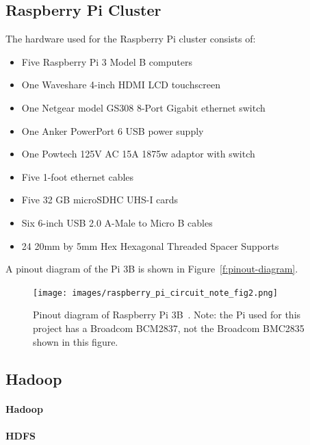 \subsection{Raspberry Pi Cluster}

The hardware used for the Raspberry Pi cluster consists of:

\begin{itemize}
\item Five Raspberry Pi 3 Model B computers 
\item One Waveshare 4-inch HDMI LCD touchscreen
\item One Netgear model GS308 8-Port Gigabit ethernet switch
\item One Anker PowerPort 6 USB power supply
\item One Powtech 125V AC 15A 1875w adaptor with switch
\item Five 1-foot ethernet cables
\item Five 32 GB microSDHC UHS-I cards
\item Six 6-inch USB 2.0 A-Male to Micro B cables
\item 24 20mm by 5mm Hex Hexagonal Threaded Spacer Supports
\end{itemize}

A pinout diagram of the Pi 3B is shown in Figure~\ref{f:pinout-diagram}.

\begin{figure}[!ht]
  \centering\texttt{[image: images/raspberry\_pi\_circuit\_note\_fig2.png]}
  \caption{Pinout diagram of Raspberry Pi 3B~\cite{hid-sp18-419-pi-pinout}. Note: the Pi used for this project has a Broadcom BCM2837, not the Broadcom BMC2835 shown in this figure.}\label{f:pinout-digram}
\end{figure}

\subsection{Hadoop}

\paragraph{Hadoop}
\paragraph{HDFS}
